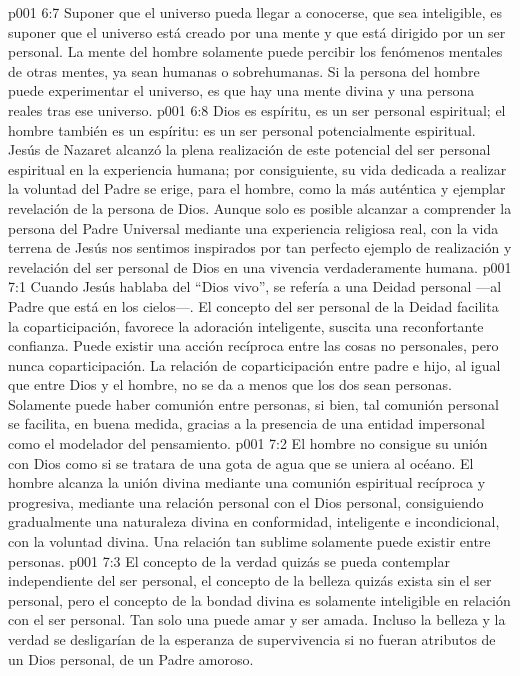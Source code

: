 \vs p001 6:7 \pc Suponer que el universo pueda llegar a conocerse, que sea inteligible, es suponer que el universo está creado por una mente y que está dirigido por un ser personal. La mente del hombre solamente puede percibir los fenómenos mentales de otras mentes, ya sean humanas o sobrehumanas. Si la persona del hombre puede experimentar el universo, es que hay una mente divina y una persona reales tras ese universo.
\vs p001 6:8 \pc Dios es espíritu, es un ser personal espiritual; el hombre también es un espíritu: es un ser personal potencialmente espiritual. Jesús de Nazaret alcanzó la plena realización de este potencial del ser personal espiritual en la experiencia humana; por consiguiente, su vida dedicada a realizar la voluntad del Padre se erige, para el hombre, como la más auténtica y ejemplar revelación de la persona de Dios. Aunque solo es posible alcanzar a comprender la persona del Padre Universal mediante una experiencia religiosa real, con la vida terrena de Jesús nos sentimos inspirados por tan perfecto ejemplo de realización y revelación del ser personal de Dios en una vivencia verdaderamente humana.
\vs p001 7:1 Cuando Jesús hablaba del “Dios vivo”, se refería a una Deidad personal ---al Padre que está en los cielos---. El concepto del ser personal de la Deidad facilita la coparticipación, favorece la adoración inteligente, suscita una reconfortante confianza. Puede existir una acción recíproca entre las cosas no personales, pero nunca coparticipación. La relación de coparticipación entre padre e hijo, al igual que entre Dios y el hombre, no se da a menos que los dos sean personas. Solamente puede haber comunión entre personas, si bien, tal comunión personal se facilita, en buena medida, gracias a la presencia de una entidad impersonal como el modelador del pensamiento.
\vs p001 7:2 El hombre no consigue su unión con Dios como si se tratara de una gota de agua que se uniera al océano. El hombre alcanza la unión divina mediante una comunión espiritual recíproca y progresiva, mediante una relación personal con el Dios personal, consiguiendo gradualmente una naturaleza divina en conformidad, inteligente e incondicional, con la voluntad divina. Una relación tan sublime solamente puede existir entre personas.
\vs p001 7:3 \pc El concepto de la verdad quizás se pueda contemplar independiente del ser personal, el concepto de la belleza quizás exista sin el ser personal, pero el concepto de la bondad divina es solamente inteligible en relación con el ser personal. Tan solo una  puede amar y ser amada. Incluso la belleza y la verdad se desligarían de la esperanza de supervivencia si no fueran atributos de un Dios personal, de un Padre amoroso.
